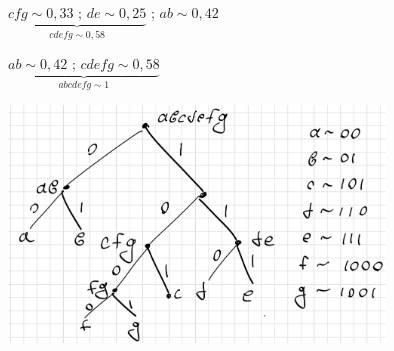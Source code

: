 \documentclass[12pt]{article}
\begin{document}
$\underbrace{cfg \sim 0,33 \text{ ; }de \sim 0,25}_{cdefg \sim 0,58}$ ; $ab \sim 0,42$

$\underbrace{ab \sim 0,42 \text{ ; }cdefg \sim 0,58}_{abcdefg \sim 1}$

\includegraphics[width=100mm]{images/tree2.png}
\end{document}
